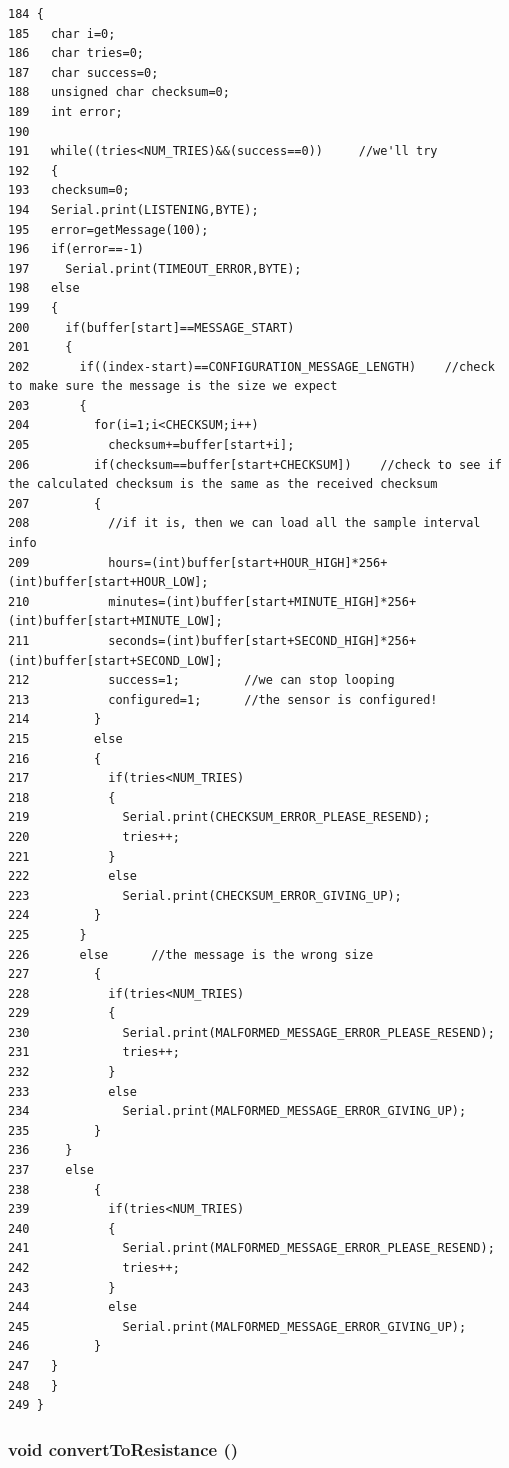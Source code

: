 \begin{Code}\begin{verbatim}184 { 
185   char i=0;
186   char tries=0;
187   char success=0;
188   unsigned char checksum=0;
189   int error;
190   
191   while((tries<NUM_TRIES)&&(success==0))     //we'll try
192   {
193   checksum=0;
194   Serial.print(LISTENING,BYTE);
195   error=getMessage(100);
196   if(error==-1)
197     Serial.print(TIMEOUT_ERROR,BYTE);
198   else
199   {
200     if(buffer[start]==MESSAGE_START)
201     {
202       if((index-start)==CONFIGURATION_MESSAGE_LENGTH)    //check to make sure the message is the size we expect
203       {
204         for(i=1;i<CHECKSUM;i++)
205           checksum+=buffer[start+i];
206         if(checksum==buffer[start+CHECKSUM])    //check to see if the calculated checksum is the same as the received checksum
207         {
208           //if it is, then we can load all the sample interval info
209           hours=(int)buffer[start+HOUR_HIGH]*256+(int)buffer[start+HOUR_LOW];
210           minutes=(int)buffer[start+MINUTE_HIGH]*256+(int)buffer[start+MINUTE_LOW];
211           seconds=(int)buffer[start+SECOND_HIGH]*256+(int)buffer[start+SECOND_LOW];
212           success=1;         //we can stop looping
213           configured=1;      //the sensor is configured!
214         }
215         else
216         {
217           if(tries<NUM_TRIES)
218           {
219             Serial.print(CHECKSUM_ERROR_PLEASE_RESEND);
220             tries++;
221           }
222           else
223             Serial.print(CHECKSUM_ERROR_GIVING_UP);
224         }
225       }
226       else      //the message is the wrong size
227         {
228           if(tries<NUM_TRIES)
229           {
230             Serial.print(MALFORMED_MESSAGE_ERROR_PLEASE_RESEND);
231             tries++;
232           }
233           else
234             Serial.print(MALFORMED_MESSAGE_ERROR_GIVING_UP);
235         }
236     }
237     else
238         {
239           if(tries<NUM_TRIES)
240           {
241             Serial.print(MALFORMED_MESSAGE_ERROR_PLEASE_RESEND);
242             tries++;
243           }
244           else
245             Serial.print(MALFORMED_MESSAGE_ERROR_GIVING_UP);
246         }
247   }
248   }
249 }
\end{verbatim}
\end{Code}


\hypertarget{temperature__sensor___terciopelo_8pde_8e666a34a083b1806167ca991be0c436}{
\subsubsection[{convertToResistance}]{\setlength{\rightskip}{0pt plus 5cm}void convertToResistance ()}}
\label{temperature__sensor___terciopelo_8pde_8e666a34a083b1806167ca991be0c436}


